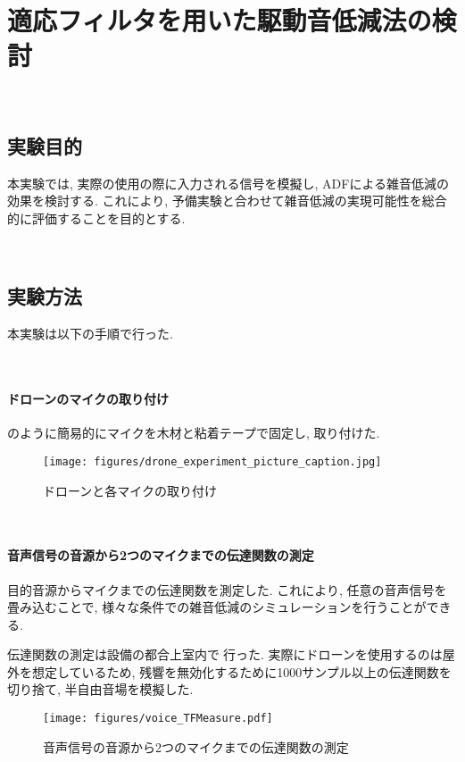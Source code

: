 \
\chapter{適応フィルタを用いた駆動音低減法の検討}\label{adf-practice}

\
\section{実験目的}\label{purpose-practice}

本実験では, 実際の使用の際に入力される信号を模擬し, ADFによる雑音低減の効果を検討する. 
これにより, 予備実験と合わせて雑音低減の実現可能性を総合的に評価することを目的とする. 

\
\section{実験方法}\label{instruction-practice}

本実験は以下の手順で行った. 

\
\subsubsection{ドローンのマイクの取り付け}\label{installment-mic}

のように簡易的にマイクを木材と粘着テープで固定し, 取り付けた. 

\begin{figure}[H]
\centering
\texttt{[image: figures/drone\_experiment\_picture\_caption.jpg]}
\caption{ドローンと各マイクの取り付け}
\label{fig:drone_experiment}
\end{figure}

\
\subsubsection{音声信号の音源から2つのマイクまでの伝達関数の測定}\label{observation-tf}

目的音源からマイクまでの伝達関数を測定した. これにより, 任意の音声信号を畳み込むことで, 様々な条件での雑音低減のシミュレーションを行うことができる. 

伝達関数の測定は設備の都合上室内で行った. 実際にドローンを使用するのは屋外を想定しているため, 残響を無効化するために1000サンプル以上の伝達関数を切り捨て, 半自由音場を模擬した. 

\begin{figure}[H]
\centering
\texttt{[image: figures/voice\_TFMeasure.pdf]}
\caption{音声信号の音源から2つのマイクまでの伝達関数の測定}
\end{figure}

